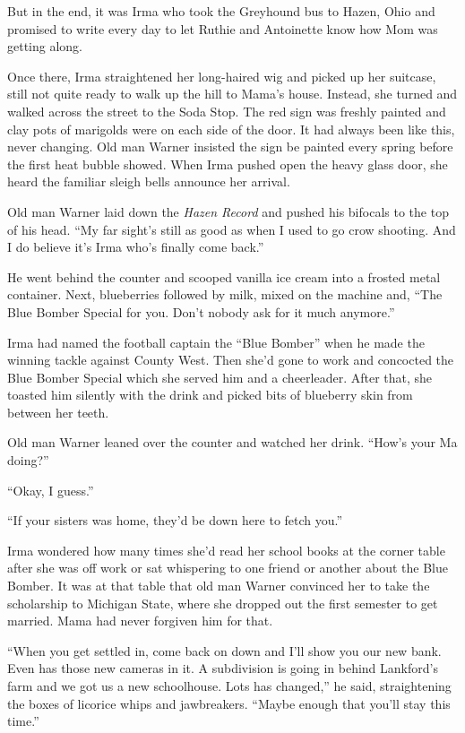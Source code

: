 \documentclass[twoside,10pt]{book}
\begin{document}
But in the end, it was Irma who took the Greyhound bus to Hazen, Ohio
and promised to write every day to let Ruthie and Antoinette know how
Mom was getting along.

Once there, Irma straightened her long-haired wig and picked up her
suitcase, still not quite ready to walk up the hill to Mama's house.
Instead, she turned and walked across the street to the Soda Stop. The
red sign was freshly painted and clay pots of marigolds were on each
side of the door. It had always been like this, never changing. Old man
Warner insisted the sign be painted every spring before the first heat
bubble showed. When Irma pushed open the heavy glass door, she heard the
familiar sleigh bells announce her arrival.

Old man Warner laid down the \emph{Hazen Record} and pushed his bifocals
to the top of his head. ``My far sight's still as good as when I used to
go crow shooting. And I do believe it's Irma who's finally come back.''

He went behind the counter and scooped vanilla ice cream into a frosted
metal container. Next, blueberries followed by milk, mixed on the
machine and, ``The Blue Bomber Special for you. Don't nobody ask for it
much anymore.''

Irma had named the football captain the ``Blue Bomber'' when he made the
winning tackle against County West. Then she'd gone to work and
concocted the Blue Bomber Special which she served him and a
cheerleader. After that, she toasted him silently with the drink and
picked bits of blueberry skin from between her teeth.

Old man Warner leaned over the counter and watched her drink. ``How's
your Ma doing?''

``Okay, I guess.''

``If your sisters was home, they'd be down here to fetch you.''

Irma wondered how many times she'd read her school books at the corner
table after she was off work or sat whispering to one friend or another
about the Blue Bomber. It was at that table that old man Warner
convinced her to take the scholarship to Michigan State, where she
dropped out the first semester to get married. Mama had never forgiven
him for that.

``When you get settled in, come back on down and I'll show you our new
bank. Even has those new cameras in it. A subdivision is going in behind
Lankford's farm and we got us a new schoolhouse. Lots has changed,'' he
said, straightening the boxes of licorice whips and jawbreakers. ``Maybe
enough that you'll stay this time.''
\end{document}
